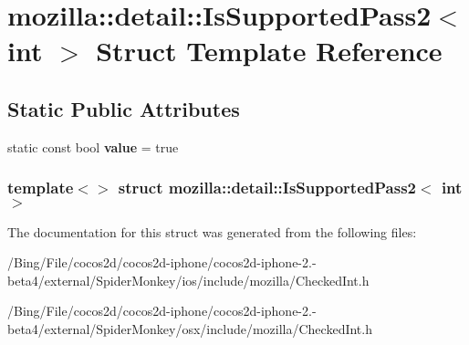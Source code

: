 \hypertarget{structmozilla_1_1detail_1_1_is_supported_pass2_3_01int_01_4}{\section{mozilla\-:\-:detail\-:\-:Is\-Supported\-Pass2$<$ int $>$ Struct Template Reference}
\label{structmozilla_1_1detail_1_1_is_supported_pass2_3_01int_01_4}
}
\subsection*{Static Public Attributes}
\begin{DoxyCompactItemize}
\item 
\hypertarget{structmozilla_1_1detail_1_1_is_supported_pass2_3_01int_01_4_ab6077ec8db242af23e31ff6541378e5c}{static const bool {\bfseries value} = true}\label{structmozilla_1_1detail_1_1_is_supported_pass2_3_01int_01_4_ab6077ec8db242af23e31ff6541378e5c}

\end{DoxyCompactItemize}
\subsubsection*{template$<$$>$ struct mozilla\-::detail\-::\-Is\-Supported\-Pass2$<$ int $>$}



The documentation for this struct was generated from the following files\-:\begin{DoxyCompactItemize}
\item 
/\-Bing/\-File/cocos2d/cocos2d-\/iphone/cocos2d-\/iphone-\/2.-\/beta4/external/\-Spider\-Monkey/ios/include/mozilla/Checked\-Int.\-h\item 
/\-Bing/\-File/cocos2d/cocos2d-\/iphone/cocos2d-\/iphone-\/2.-\/beta4/external/\-Spider\-Monkey/osx/include/mozilla/Checked\-Int.\-h\end{DoxyCompactItemize}

